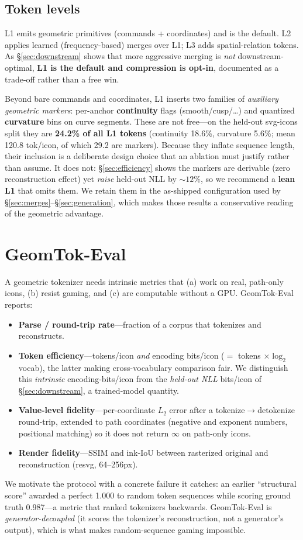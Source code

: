 \documentclass[11pt]{article}
\begin{document}
\subsection{Token levels}
\label{sec:levels}
L1 emits geometric primitives (commands + coordinates) and is the default. L2 applies learned (frequency-based) merges over L1; L3 adds spatial-relation tokens. As \S\ref{sec:downstream} shows that more aggressive merging is \emph{not} downstream-optimal, \textbf{L1 is the default and compression is opt-in}, documented as a trade-off rather than a free win.

Beyond bare commands and coordinates, L1 inserts two families of \emph{auxiliary geometric markers}: per-anchor \textbf{continuity} flags (smooth/cusp/\ldots) and quantized \textbf{curvature} bins on curve segments. These are not free---on the held-out svg-icons split they are \textbf{24.2\% of all L1 tokens} (continuity 18.6\%, curvature 5.6\%; mean 120.8 tok/icon, of which 29.2 are markers). Because they inflate sequence length, their inclusion is a deliberate design choice that an ablation must justify rather than assume. It does not: \S\ref{sec:efficiency} shows the markers are derivable (zero reconstruction effect) yet \emph{raise} held-out NLL by ${\sim}12\%$, so we recommend a \textbf{lean L1} that omits them. We retain them in the as-shipped configuration used by \S\ref{sec:merges}--\S\ref{sec:generation}, which makes those results a conservative reading of the geometric advantage.

\section{GeomTok-Eval}
\label{sec:eval}
A geometric tokenizer needs intrinsic metrics that (a) work on real, path-only icons, (b) resist gaming, and (c) are computable without a GPU. GeomTok-Eval reports:
\begin{itemize}
\item \textbf{Parse / round-trip rate}---fraction of a corpus that tokenizes and reconstructs.
\item \textbf{Token efficiency}---tokens/icon \emph{and} encoding bits/icon ($=$ tokens $\times \log_2$ vocab), the latter making cross-vocabulary comparison fair. We distinguish this \emph{intrinsic} encoding-bits/icon from the \emph{held-out NLL} bits/icon of \S\ref{sec:downstream}, a trained-model quantity.
\item \textbf{Value-level fidelity}---per-coordinate $L_2$ error after a tokenize$\rightarrow$detokenize round-trip, extended to path coordinates (negative and exponent numbers, positional matching) so it does not return $\infty$ on path-only icons.
\item \textbf{Render fidelity}---SSIM and ink-IoU between rasterized original and reconstruction (resvg, 64--256px).
\end{itemize}
We motivate the protocol with a concrete failure it catches: an earlier ``structural score'' awarded a perfect 1.000 to random token sequences while scoring ground truth 0.987---a metric that ranked tokenizers backwards. GeomTok-Eval is \emph{generator-decoupled} (it scores the tokenizer's reconstruction, not a generator's output), which is what makes random-sequence gaming impossible.
\end{document}
